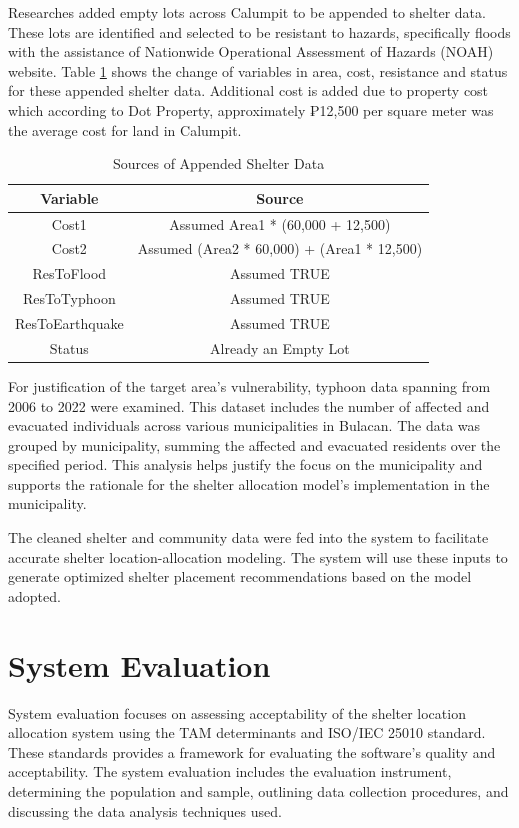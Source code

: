 	Researches added empty lots across Calumpit to be appended to shelter data. These lots are identified and selected to be resistant to hazards, specifically floods with the assistance of Nationwide Operational Assessment of Hazards (NOAH) website. Table \ref{AppendData} shows the change of variables in area, cost, resistance and status for these appended shelter data. Additional cost is added due to property cost which according to Dot Property, approximately ₱12,500 per square meter was the average cost for land in Calumpit.
	
	\begin{table}[h]
		\centering
		\caption{Sources of Appended Shelter Data}
		\label{AppendData}
			\begin{tabular}{|c|c|}
				\hline
				\multicolumn{1}{|c|}{\textbf{Variable}} & 
				\multicolumn{1}{c|}{\textbf{Source}} \\ \hline
				Cost1     & Assumed Area1 * (60,000 + 12,500) \\ \hline
				Cost2     & Assumed (Area2 * 60,000) + (Area1 * 12,500) \\ \hline
				ResToFlood     & Assumed TRUE \\ \hline
				ResToTyphoon    & Assumed TRUE \\ \hline
				ResToEarthquake     & Assumed TRUE \\ \hline
				Status     & Already an Empty Lot \\ \hline
				
			\end{tabular}
	\end{table}
	
	For justification of the target area’s vulnerability, typhoon data spanning from 2006 to 2022 were examined. This dataset includes the number of affected and evacuated individuals across various municipalities in Bulacan. The data was grouped by municipality, summing the affected and evacuated residents over the specified period. This analysis helps justify the focus on the municipality and supports the rationale for the shelter allocation model’s implementation in the municipality.
	
	The cleaned shelter and community data were fed into the system to facilitate accurate shelter location-allocation modeling. The system will use these inputs to generate optimized shelter placement recommendations based on the model adopted.
	
	
\section{System Evaluation}
	System evaluation focuses on assessing acceptability of the shelter location allocation system using the TAM determinants and ISO/IEC 25010 standard. These standards provides a framework for evaluating the software's quality and acceptability. The system evaluation includes the evaluation instrument, determining the population and sample, outlining data collection procedures, and discussing the data analysis techniques used.


